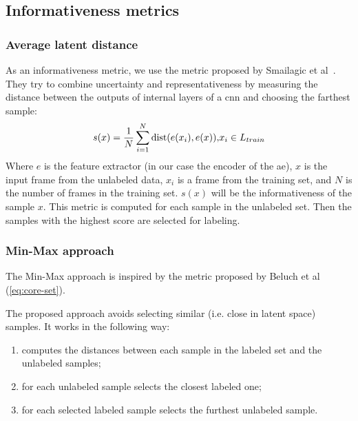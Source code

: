    \subsection{Informativeness metrics}
        
        \subsubsection{Average latent distance}
        \label{sub:avg-dist}
        As an informativeness metric, we use the metric proposed by Smailagic et al~\cite{smailagic2018medal}. They try to combine uncertainty and representativeness by measuring the distance between the outputs of internal layers of a \acrshort{cnn} and choosing the farthest sample:
        \begin{dmath}
            {s(x) = \frac{1}{N}\sum_{i=1}^N\text{dist}(e(x_i), e(x)),}
            \\
            {x_i\in L_{train}}
            \label{eq:intermediate-cnn}
        \end{dmath}
        Where $e$ is the feature extractor (in our case the encoder of the \acrshort{ae}), $x$ is the input frame from the unlabeled data, $x_i$ is a frame from the training set, and $N$ is the number of frames in the training set.
        $s(x)$ will be the informativeness of the sample $x$. This metric is computed for each sample in the unlabeled set. Then the samples with the highest score are selected for labeling.

    \subsubsection{Min-Max approach}
    \label{sub:minmax}
    The Min-Max approach is inspired by the metric proposed by Beluch et al~\cite{beluch2018power} (\autoref{eq:core-set}).
    
    The proposed approach avoids selecting similar (i.e. close in latent space) samples.
    It works in the following way:
    \begin{enumerate}
        \item computes the distances between each sample in the labeled set and the unlabeled samples;
        \item for each unlabeled sample selects the closest labeled one;
        \item for each selected labeled sample selects the furthest unlabeled sample.
    \end{enumerate}

